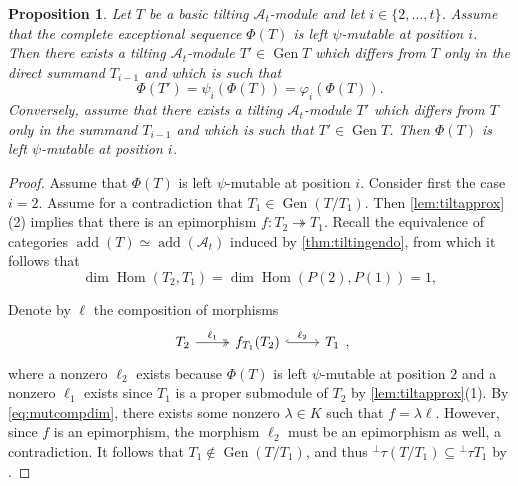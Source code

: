 \documentclass[10pt,twoside, a4paper,reqno]{amsart}
\DeclareMathOperator{\Hom}{Hom}
\DeclareMathOperator{\add}{add}
\DeclareMathOperator{\Gen}{Gen}
\newcommand{\A}{\mathscr{A}}
\newtheorem{proposition}[theorem]{Proposition}
\theoremstyle{definition}
\begin{document}
\begin{proposition}\label{prop:mutcomp}
	Let $T$ be a basic tilting $\A_t$-module and let $i \in \{2, \dots, t\}$. Assume that the complete exceptional sequence $\Phi(T)$ is left $\psi$-mutable at position $i$. Then there exists a tilting $\A_t$-module $T' \in \Gen T$ which differs from $T$ only in the direct summand $T_{i-1}$ and which is such that 
	\[ \Phi(T') = \psi_{i}(\Phi(T)) = \varphi_i(\Phi(T)). \]
	Conversely, assume that there exists a tilting $\A_t$-module $T'$ which differs from $T$ only in the summand $T_{i-1}$ and which is such that $T' \in \Gen T$. Then $\Phi(T)$ is left $\psi$-mutable at position $i$. 
\end{proposition}
\begin{proof}	
	Assume that $\Phi(T)$ is left $\psi$-mutable at position $i$. Consider first the case $i=2$. Assume for a contradiction that $T_1 \in \Gen(T/T_1)$. Then \cref{lem:tiltapprox}(2) implies that there is an epimorphism $f: T_2 \twoheadrightarrow T_1$. 
	Recall the equivalence of categories $\add(T) \simeq \add(\A_t)$ induced by \cref{thm:tiltingendo}, from which it follows that
	\begin{equation}\label{eq:mutcompdim} \dim \Hom(T_2, T_1) = \dim \Hom(P(2), P(1)) = 1,\end{equation}
	
	Denote by $\ell$ the composition of morphisms
	\[ \begin{tikzcd} T_2 \arrow[r, twoheadrightarrow, "\ell_1"] & f_{T_1} (T_2)  \arrow[r, hookrightarrow, "\ell_2"] & T_1  \end{tikzcd}, \]
	where a nonzero $\ell_2$ exists because $\Phi(T)$ is left $\psi$-mutable at position $2$ and a nonzero $\ell_1$ exists since $T_1$ is a proper submodule of $T_2$ by \cref{lem:tiltapprox}(1). By \cref{eq:mutcompdim}, there exists some nonzero $\lambda \in K$ such that $f = \lambda \ell$. However, since $f$ is an epimorphism, the morphism $\ell_2$ must be an epimorphism as well, a contradiction. It follows that $T_1 \not \in \Gen(T/T_1)$, and thus ${}^\perp \tau(T/T_1) \subseteq {}^\perp \tau T_1$ by \cite[Prop. 2.22]{AIR2014}.
	

\end{proof}
\end{document}
